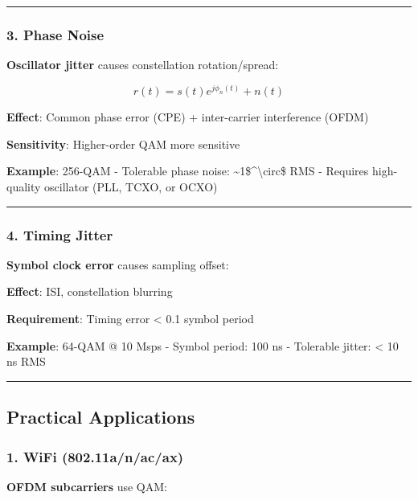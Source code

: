 \begin{center}\rule{0.5\linewidth}{0.5pt}\end{center}

\subsubsection{3. Phase Noise}\label{phase-noise}

\textbf{Oscillator jitter} causes constellation rotation/spread:

\[
r(t) = s(t) e^{j\phi_n(t)} + n(t)
\]

\textbf{Effect}: Common phase error (CPE) + inter-carrier interference
(OFDM)

\textbf{Sensitivity}: Higher-order QAM more sensitive

\textbf{Example}: 256-QAM - Tolerable phase noise:
\textasciitilde1\$\^{}\textbackslash circ\$ RMS - Requires high-quality
oscillator (PLL, TCXO, or OCXO)

\begin{center}\rule{0.5\linewidth}{0.5pt}\end{center}

\subsubsection{4. Timing Jitter}\label{timing-jitter}

\textbf{Symbol clock error} causes sampling offset:

\textbf{Effect}: ISI, constellation blurring

\textbf{Requirement}: Timing error \textless{} 0.1 symbol period

\textbf{Example}: 64-QAM @ 10 Msps - Symbol period: 100 ns - Tolerable
jitter: \textless{} 10 ns RMS

\begin{center}\rule{0.5\linewidth}{0.5pt}\end{center}

\subsection{Practical Applications}\label{practical-applications}

\subsubsection{1. WiFi (802.11a/n/ac/ax)}\label{wifi-802.11anacax}

\textbf{OFDM subcarriers} use QAM:

